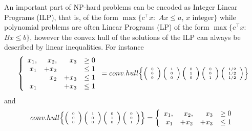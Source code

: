 An important part of NP-hard problems can be encoded as Integer Linear Programs (ILP), that is, of the form
$\max\{c^\top x:$ 
$Ax\le a$, 
$x$
 integer$\}$
 while polynomial problems are often Linear Programs (LP) of the form
 $\max\{c^\top x:$ 
 $Bx\le b\}$, however the convex hull of the solutions of the ILP can always be described by linear inequalities.
 For instance 
 {\footnotesize
 $$
 \left\{
 \begin{array}{rrrl}
  x_1, &x_2,& x_3 & \ge 0\\
 x_1 & +x_2 & &\le 1\\
 & x_2 & +x_3  &\le 1\\
 x_1 & & +x_3  &\le 1
  \end{array}
 \right.
 =
  conv.hull\Big\{
 {\tiny
 \left(\begin{array}{c}0\\0\\0\end{array}\right)
 \left(\begin{array}{c}1\\0\\0\end{array}\right)
 \left(\begin{array}{c}0\\1\\0\end{array}\right)
 \left(\begin{array}{c}0\\0\\1\end{array}\right)
  \left(\begin{array}{c}1/2\\1/2\\1/2\end{array}\right)
 }
\Big \}
$$
}
and
 {\footnotesize
 $$
  conv.hull\Big\{
 {\tiny
 \left(\begin{array}{c}0\\0\\0\end{array}\right)
 \left(\begin{array}{c}1\\0\\0\end{array}\right)
 \left(\begin{array}{c}0\\1\\0\end{array}\right)
 \left(\begin{array}{c}0\\0\\1\end{array}\right)
 }
\Big \}
=
  \left\{
 \begin{array}{rrrl}
  x_1, &x_2,& x_3 & \ge 0\\
 x_1 & +x_2  & +x_3  &\le 1
 \end{array}
 \right. 
 $$ 
 }
